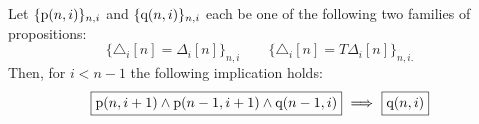\begin{lemma}
    Let $\{\mathrm{p}(n, i)\}_{n, i}$ and $\{\mathrm{q}(n, i)\}_{n, i}$ each be one of the following two families of propositions:
    \[ \label{proposition: uniqueness: eq1}
    \big\{ \triangle_i  [n] = \Delta_ i [n] \big\}_{n, i} \qquad
    \big\{ \triangle_i  [n] = T \Delta_ i [n] \big\}_{n, i.}
    \]
    Then, for $i < n-1$ the following implication holds:
    \[ \label{proposition: uniqueness: eq2}
    \boxed{\p(n,i+1) \wedge \p(n-1,i+1) \wedge \q(n-1,i)}\ \Longrightarrow\ \boxed{\q(n,i)}
    \]
\end{lemma}

%

%
